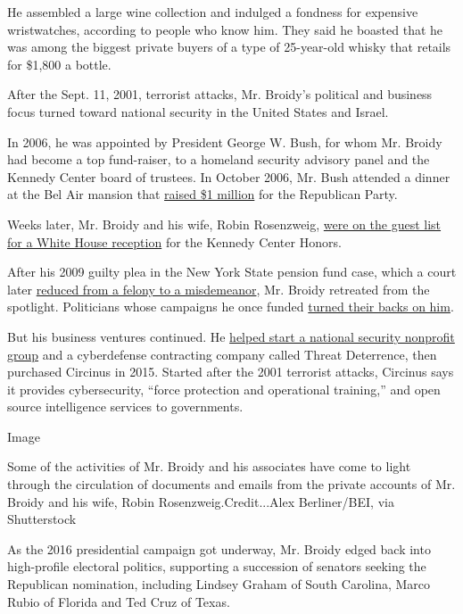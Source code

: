 He assembled a large wine collection and indulged a fondness for
expensive wristwatches, according to people who know him. They said he
boasted that he was among the biggest private buyers of a type of
25-year-old whisky that retails for \$1,800 a bottle.

After the Sept. 11, 2001, terrorist attacks, Mr. Broidy's political and
business focus turned toward national security in the United States and
Israel.

In 2006, he was appointed by President George W. Bush, for whom Mr.
Broidy had become a top fund-raiser, to a homeland security advisory
panel and the Kennedy Center board of trustees. In October 2006, Mr.
Bush attended a dinner at the Bel Air mansion that
\href{https://www.latimes.com/politics/la-na-elliott-broidy-trump-20180811-story.html}{raised
\$1 million} for the Republican Party.

Weeks later, Mr. Broidy and his wife, Robin Rosenzweig,
\href{https://georgewbush-whitehouse.archives.gov/news/releases/2006/12/text/20061203.html}{were
on the guest list for a White House reception} for the Kennedy Center
Honors.

After his 2009 guilty plea in the New York State pension fund case,
which a court later
\href{https://www.nydailynews.com/news/crime/no-jail-time-guilty-israeli-investor-article-1.1209146}{reduced
from a felony to a misdemeanor}, Mr. Broidy retreated from the
spotlight. Politicians whose campaigns he once funded
\href{https://www.latimes.com/archives/la-xpm-2009-dec-08-la-me-broidy8-2009dec08-story.html}{turned
their backs on him}.

But his business ventures continued. He
\href{https://www.documentcloud.org/documents/6205003-The-Announcement-of-the-Formation-of-the.html}{helped
start a national security nonprofit group} and a cyberdefense
contracting company called Threat Deterrence, then purchased Circinus in
2015. Started after the 2001 terrorist attacks, Circinus says it
provides cybersecurity, ``force protection and operational training,''
and open source intelligence services to governments.

Image

Some of the activities of Mr. Broidy and his associates have come to
light through the circulation of documents and emails from the private
accounts of Mr. Broidy and his wife, Robin Rosenzweig.Credit...Alex
Berliner/BEI, via Shutterstock

As the 2016 presidential campaign got underway, Mr. Broidy edged back
into high-profile electoral politics, supporting a succession of
senators seeking the Republican nomination, including Lindsey Graham of
South Carolina, Marco Rubio of Florida and Ted Cruz of Texas.

